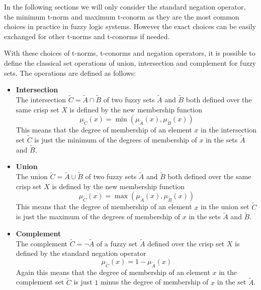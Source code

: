 In the following sections we will only consider the standard negation operator, the minimum t-norm and maximum t-conorm as they are the most common choices in practice in fuzzy logic systems. However the exact choices can be easily exchanged for other t-norms and t-conorms if needed.


With these choices of t-norms, t-conorms and negation operators, it is possible to define the classical set operations of union, intersection and complement for fuzzy sets. The operations are defined as follows:


\begin{itemize}

      \item \textbf{Intersection} \\
            The intersection $\tilde{C} = \tilde{A} \cap \tilde{B}$ of two fuzzy sets $\tilde{A}$ and $\tilde{B}$ both defined over the same crisp set $X$ is defined by the new membership function
            \begin{equation}
                  \mu_{\tilde{C}}(x) = \min(\mu_{\tilde{A}}(x), \mu_{\tilde{B}}(x))
            \end{equation}
            This means that the degree of membership of an element $x$ in the intersection set $\tilde{C}$ is just the minimum of the degrees of membership of $x$ in the sets $\tilde{A}$ and $\tilde{B}$.
      \item \textbf{Union} \\
            The union $\tilde{C} = \tilde{A} \cup \tilde{B}$ of two fuzzy sets $\tilde{A}$ and $\tilde{B}$ both defined over the same crisp set $X$ is defined by the new membership function
            \begin{equation}
                  \mu_{\tilde{C}}(x) = \max(\mu_{\tilde{A}}(x), \mu_{\tilde{B}}(x))
            \end{equation}
            This means that the degree of membership of an element $x$ in the union set $\tilde{C}$ is just the maximum of the degrees of membership of $x$ in the sets $\tilde{A}$ and $\tilde{B}$.

      \item \textbf{Complement} \\
            The complement $\tilde{C} = \neg \tilde{A}$ of a fuzzy set $\tilde{A}$ defined over the crisp set $X$ is defined by the standard negation operator
            \begin{equation}
                  \mu_{\tilde{C}}(x) = 1 - \mu_{\tilde{A}}(x)
            \end{equation}
            Again this means that the degree of membership of an element $x$ in the complement set $\tilde{C}$ is just $1$ minus the degree of membership of $x$ in the set $\tilde{A}$.
\end{itemize}

